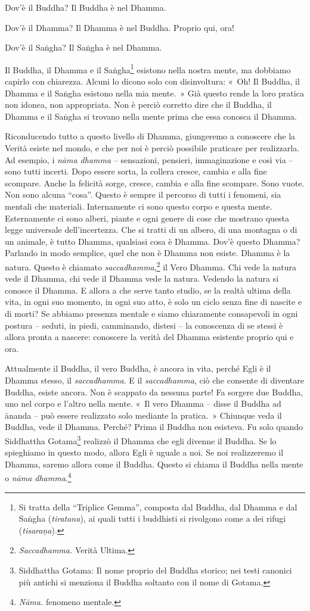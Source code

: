 Dov'è il Buddha? Il Buddha è nel Dhamma.

Dov'è il Dhamma? Il Dhamma è nel Buddha. Proprio qui, ora!

Dov'è il Saṅgha? Il Saṅgha è nel Dhamma.

Il Buddha, il Dhamma e il Saṅgha\footnote{Si tratta della ``Triplice
  Gemma'', composta dal Buddha, dal Dhamma e dal Saṅgha
  (\emph{tiratana}), ai quali tutti i buddhisti si rivolgono come a dei
  rifugi (\emph{tisaraṇa}).} esistono nella nostra mente, ma dobbiamo
capirlo con chiarezza. Alcuni lo dicono solo con disinvoltura: «~Oh! Il
Buddha, il Dhamma e il Saṅgha esistono nella mia mente.~» Già questo
rende la loro pratica non idonea, non appropriata. Non è perciò corretto
dire che il Buddha, il Dhamma e il Saṅgha si trovano nella mente prima
che essa conosca il Dhamma.

Riconducendo tutto a questo livello di Dhamma, giungeremo a conoscere
che la Verità esiste nel mondo, e che per noi è perciò possibile
praticare per realizzarla. Ad esempio, i \emph{nāma dhamma} --
sensazioni, pensieri, immaginazione e così via -- sono tutti incerti.
Dopo essere sorta, la collera cresce, cambia e alla fine scompare. Anche
la felicità sorge, cresce, cambia e alla fine scompare. Sono vuote. Non
sono alcuna ``cosa''. Questo è sempre il percorso di tutti i fenomeni,
sia mentali che materiali. Internamente ci sono questo corpo e questa
mente. Esternamente ci sono alberi, piante e ogni genere di cose che
mostrano questa legge universale dell'incertezza. Che si tratti di un
albero, di una montagna o di un animale, è tutto Dhamma, qualsiasi cosa
è Dhamma. Dov'è questo Dhamma? Parlando in modo semplice, quel che non è
Dhamma non esiste. Dhamma è la natura. Questo è chiamato
\emph{saccadhamma},\footnote{\emph{Saccadhamma.} Verità Ultima.}
il Vero Dhamma. Chi vede la natura vede il Dhamma, chi
vede il Dhamma vede la natura. Vedendo la natura si conosce il Dhamma. E
allora a che serve tanto studio, se la realtà ultima della vita, in ogni
suo momento, in ogni suo atto, è solo un ciclo senza fine di nascite e
di morti? Se abbiamo presenza mentale e siamo chiaramente consapevoli in
ogni postura -- seduti, in piedi, camminando, distesi -- la conoscenza
di se stessi è allora pronta a nascere: conoscere la verità del Dhamma
esistente proprio qui e ora.

Attualmente il Buddha, il vero Buddha, è ancora in vita, perché Egli è
il Dhamma stesso, il \emph{saccadhamma}. E il \emph{saccadhamma}, ciò
che consente di diventare Buddha, esiste ancora. Non è scappato da
nessuna parte! Fa sorgere due Buddha, uno nel corpo e l'altro nella
mente. «~Il vero Dhamma -- disse il Buddha ad ānanda -- può essere
realizzato solo mediante la pratica.~» Chiunque veda il Buddha, vede il
Dhamma. Perché? Prima il Buddha non esisteva. Fu solo quando Siddhattha
Gotama\footnote{Siddhattha Gotama: Il nome proprio del Buddha storico;
  nei testi canonici più antichi si menziona il Buddha soltanto con il
  nome di Gotama.} realizzò il Dhamma che egli divenne il Buddha. Se lo
spieghiamo in questo modo, allora Egli è uguale a noi. Se noi
realizzeremo il Dhamma, saremo allora come il Buddha. Questo si chiama
il Buddha nella mente o \emph{nāma dhamma}.\footnote{\emph{Nāma.}
  fenomeno mentale.}

